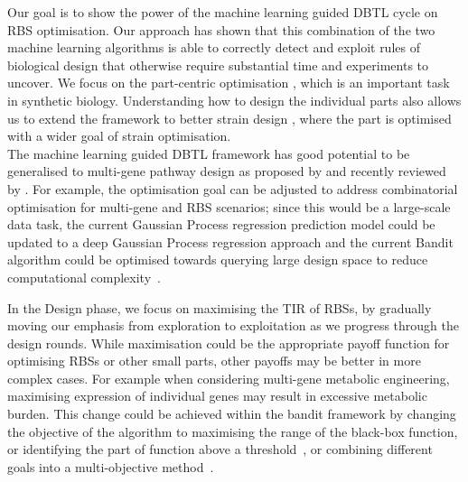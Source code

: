 \documentclass{article}
\begin{document}
Our goal is to show the power of the machine learning guided DBTL cycle on RBS optimisation.
Our approach has shown that this combination of the two machine learning algorithms is able to correctly detect and exploit rules of biological design that otherwise require substantial time and experiments to uncover.
We focus on the part-centric optimisation \textcite{Hollerer2020}, which is an important task in synthetic biology. 
Understanding how to design the individual parts also allows us to extend the framework to better strain design \textcite{Jervis2019}, where the part is optimised with a wider goal of strain optimisation.
\\

The machine learning guided DBTL framework has good potential to be generalised to multi-gene pathway
design as proposed by \textcite{hamedirad2019towards} and recently reviewed by \textcite{LAWSON2021}.
For example, the optimisation goal can be adjusted to address combinatorial optimisation for multi-gene and RBS scenarios; since this would be a large-scale data task, the current Gaussian Process regression prediction model could be updated to a deep Gaussian Process regression approach and the current Bandit algorithm could be optimised towards querying large design space to reduce computational complexity~\cite{Shahriari2016}.

In the Design phase, we focus on maximising the TIR of RBSs, by gradually moving our emphasis from exploration to exploitation as we progress through the design rounds.
While maximisation could be the appropriate payoff function for optimising RBSs
or other small parts, other payoffs may be better in more complex cases.
For example when considering multi-gene metabolic engineering, maximising expression of individual genes may result in excessive metabolic burden.
This change could be achieved within the bandit framework by changing the objective of the algorithm to maximising the range of the black-box function, or identifying the part of function above a threshold~\cite{gotovos2013active}, or combining different goals into a multi-objective method~\cite{shu2020new}.\\
\end{document}
